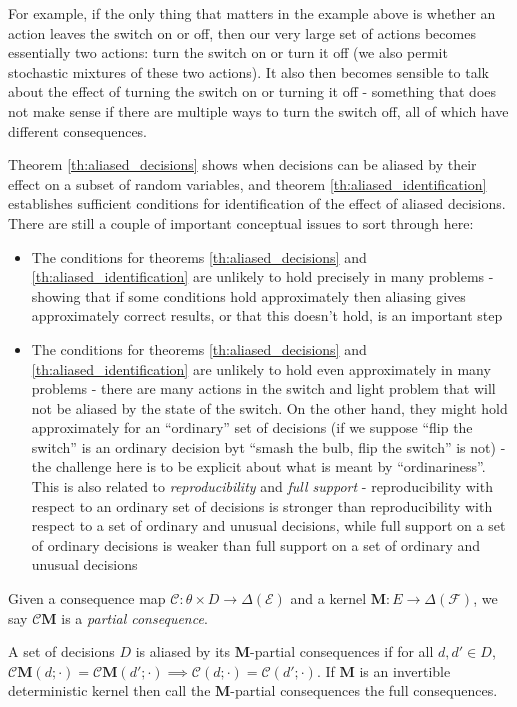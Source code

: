 For example, if the only thing that matters in the example above is whether an action leaves the switch on or off, then our very large set of actions becomes essentially two actions: turn the switch on or turn it off (we also permit stochastic mixtures of these two actions). It also then becomes sensible to talk about the effect of turning the switch on or turning it off - something that does not make sense if there are multiple ways to turn the switch off, all of which have different consequences.

Theorem \ref{th:aliased_decisions} shows when decisions can be aliased by their effect on a subset of random variables, and theorem \ref{th:aliased_identification} establishes sufficient conditions for identification of the effect of aliased decisions. There are still a couple of important conceptual issues to sort through here:

\begin{itemize}
	\item The conditions for theorems \ref{th:aliased_decisions} and \ref{th:aliased_identification} are unlikely to hold precisely in many problems - showing that if some conditions hold approximately then aliasing gives approximately correct results, or that this doesn't hold, is an important step
	\item The conditions for theorems \ref{th:aliased_decisions} and \ref{th:aliased_identification} are unlikely to hold even approximately in many problems - there are many actions in the switch and light problem that will not be aliased by the state of the switch. On the other hand, they might hold approximately for an ``ordinary'' set of decisions (if we suppose ``flip the switch'' is an ordinary decision byt ``smash the bulb, flip the switch'' is not) - the challenge here is to be explicit about what is meant by ``ordinariness''. This is also related to \emph{reproducibility} and \emph{full support} - reproducibility with respect to an ordinary set of decisions is stronger than reproducibility with respect to a set of ordinary and unusual decisions, while full support on a set of ordinary decisions is weaker than full support on a set of ordinary and unusual decisions
\end{itemize}

\begin{definition}
Given a consequence map $\mathscr{C}:\theta\times D\to \Delta(\mathcal{E})$ and a kernel $\mathbf{M}:E\to \Delta(\mathcal{F})$, we say $\mathscr{C}\mathbf{M}$ is a \emph{partial consequence}.

A set of decisions $D$ is aliased by its $\mathbf{M}$-partial consequences if for all $d,d'\in D$, $\mathscr{C}\mathbf{M}(d;\cdot) = \mathscr{C}\mathbf{M}(d';\cdot) \implies \mathscr{C}(d;\cdot)=\mathscr{C}(d';\cdot)$. If $\mathbf{M}$ is an invertible deterministic kernel then call the $\mathbf{M}$-partial consequences the full consequences.
\end{definition}

